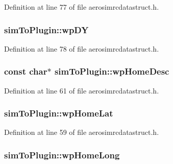 Definition at line 77 of file aerosimrcdatastruct.\-h.

\hypertarget{group___aero_sim_r_c_ga04968f40e2545a32b4e052fe9e632504}{
\subsubsection[{wp\-D\-Y}]{ sim\-To\-Plugin\-::wp\-D\-Y}}\label{group___aero_sim_r_c_ga04968f40e2545a32b4e052fe9e632504}


Definition at line 78 of file aerosimrcdatastruct.\-h.

\hypertarget{group___aero_sim_r_c_ga8662d58603fa2a33c7959677b0ec7783}{
\subsubsection[{wp\-Home\-Desc}]{\setlength{\rightskip}{0pt plus 5cm}const char$\ast$ sim\-To\-Plugin\-::wp\-Home\-Desc}}\label{group___aero_sim_r_c_ga8662d58603fa2a33c7959677b0ec7783}


Definition at line 61 of file aerosimrcdatastruct.\-h.

\hypertarget{group___aero_sim_r_c_ga5364e2cce6429762b9597145fc144130}{
\subsubsection[{wp\-Home\-Lat}]{ sim\-To\-Plugin\-::wp\-Home\-Lat}}\label{group___aero_sim_r_c_ga5364e2cce6429762b9597145fc144130}


Definition at line 59 of file aerosimrcdatastruct.\-h.

\hypertarget{group___aero_sim_r_c_ga1a595cb81efdafe9ec21ef40211ad74e}{
\subsubsection[{wp\-Home\-Long}]{ sim\-To\-Plugin\-::wp\-Home\-Long}}\label{group___aero_sim_r_c_ga1a595cb81efdafe9ec21ef40211ad74e}


